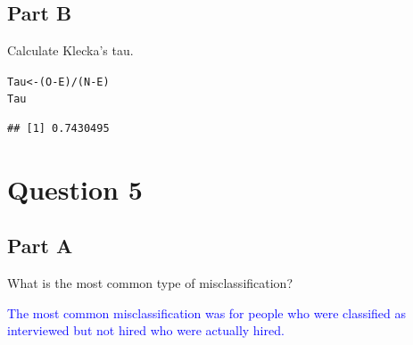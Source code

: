 \documentclass{article}\usepackage[]{graphicx}\usepackage[]{color}
\makeatletter
\newcommand{\hlopt}[1]{\textcolor[rgb]{0,0,0}{#1}}%
\newcommand{\hlstd}[1]{\textcolor[rgb]{0.345,0.345,0.345}{#1}}%
\newcommand{\hlkwb}[1]{\textcolor[rgb]{0.69,0.353,0.396}{#1}}%
\newenvironment{kframe}{%
 \def\at@end@of@kframe{}%
 \ifinner\ifhmode%
  \def\at@end@of@kframe{\end{minipage}}%
  \begin{minipage}{\columnwidth}%
 \fi\fi%
 \def\FrameCommand##1{\hskip\@totalleftmargin \hskip-\fboxsep
 \colorbox{shadecolor}{##1}\hskip-\fboxsep
     \hskip-\linewidth \hskip-\@totalleftmargin \hskip\columnwidth}%
 \MakeFramed {\advance\hsize-\width
   \@totalleftmargin\z@ \linewidth\hsize
   \@setminipage}}%
 {\par\unskip\endMakeFramed%
 \at@end@of@kframe}
\newenvironment{knitrout}{}{} %
\makeatother
\begin{document}
\subsection{Part B}
Calculate Klecka’s tau.

\begin{knitrout}
\color{fgcolor}\begin{kframe}
\begin{alltt}
\hlstd{Tau} \hlkwb{<-} \hlstd{(O} \hlopt{-} \hlstd{E)}\hlopt{/}\hlstd{(N} \hlopt{-} \hlstd{E)}
\hlstd{Tau}
\end{alltt}
\begin{verbatim}
## [1] 0.7430495
\end{verbatim}
\end{kframe}
\end{knitrout}

\section{Question 5}
\subsection{Part A}
What is the most common type of misclassification?

\textcolor{blue}{The most common misclassification was for people who were classified as interviewed but not hired who were actually hired.}
\end{document}
